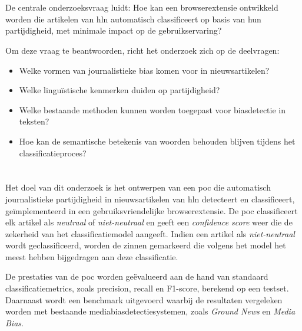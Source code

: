 \section{}
\label{sec:onderzoeksvraag}

De centrale onderzoeksvraag luidt: Hoe kan een browserextensie ontwikkeld worden die artikelen van \gls{hln} automatisch classificeert op basis van hun partijdigheid, met minimale impact op de gebruikservaring?

Om deze vraag te beantwoorden, richt het onderzoek zich op de deelvragen:

\begin{itemize}
  \item Welke vormen van journalistieke bias komen voor in nieuwsartikelen?
  \item Welke linguïstische kenmerken duiden op partijdigheid?
  \item Welke bestaande methoden kunnen worden toegepast voor biasdetectie in teksten?
  \item Hoe kan de semantische betekenis van woorden behouden blijven tijdens het classificatieproces?
\end{itemize}

\section{}
\label{sec:onderzoeksdoelstelling}

Het doel van dit onderzoek is het ontwerpen van een \gls{poc} die automatisch journalistieke partijdigheid in nieuwsartikelen van \gls{hln} detecteert en classificeert, geïmplementeerd in een gebruiksvriendelijke browserextensie. De \gls{poc} classificeert elk artikel als \textit{neutraal} of \textit{niet-neutraal} en geeft een \textit{confidence score} weer die de zekerheid van het classificatiemodel aangeeft. Indien een artikel als \textit{niet-neutraal} wordt geclassificeerd, worden de zinnen gemarkeerd die volgens het model het meest hebben bijgedragen aan deze classificatie.

De prestaties van de \gls{poc} worden geëvalueerd aan de hand van standaard classificatiemetrics, zoals precision, recall en F1-score, berekend op een testset. Daarnaast wordt een benchmark uitgevoerd waarbij de resultaten vergeleken worden met bestaande mediabiasdetectiesystemen, zoals \textit{Ground News} en \textit{Media Bias}.

